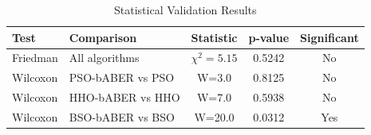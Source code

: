 \begin{table}[htbp]
\centering
\caption{Statistical Validation Results}
\label{tab:statistical_tests}
\begin{tabular}{llccc}
\hline
Test & Comparison & Statistic & p-value & Significant \\
\hline
Friedman & All algorithms & $\chi^2=5.15$ & 0.5242 & No \\
\hline
Wilcoxon & PSO-bABER vs PSO & W=3.0 & 0.8125 & No \\
Wilcoxon & HHO-bABER vs HHO & W=7.0 & 0.5938 & No \\
Wilcoxon & BSO-bABER vs BSO & W=20.0 & 0.0312 & Yes \\
\hline
\end{tabular}
\end{table}
